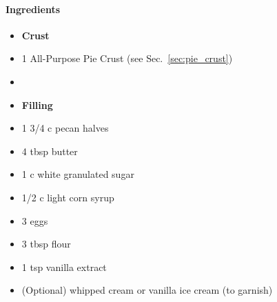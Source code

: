\documentclass[12pt]{article}
\newenvironment*{ingredients}
	{
		\paragraph*{Ingredients}
		\begin{itemize}
	}
	{
		\end{itemize}
	}
\begin{document}
	\begin{ingredients}
		\item[] \textbf{Crust}
		\item 1 All-Purpose Pie Crust (see Sec.~\ref{sec:pie_crust})
		\item[] \hfill
		\item[] \textbf{Filling}
		\item 1 3/4 c pecan halves
		\item 4 tbsp butter
		\item 1 c white granulated sugar
		\item 1/2 c light corn syrup
		\item 3 eggs
		\item 3 tbsp flour
		\item 1 tsp vanilla extract
		\item (Optional) whipped cream or vanilla ice cream (to garnish)
	\end{ingredients}
	
\end{document}

